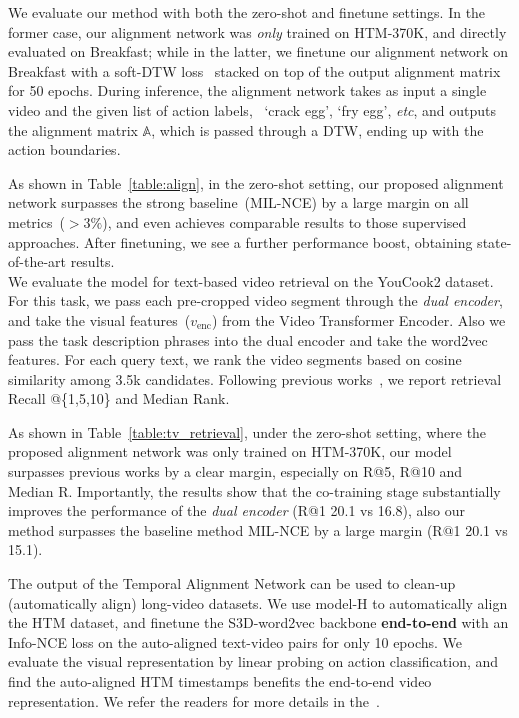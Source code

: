 We evaluate our method with both the zero-shot and finetune settings.
In the former case, 
our alignment network was \emph{only} trained on HTM-370K, 
and directly evaluated on Breakfast;
while in the latter, 
we finetune our alignment network on Breakfast with a soft-DTW loss~\cite{Cuturi17} stacked on top of the output alignment matrix for 50 epochs. 
During inference, the alignment network takes as input a single video and the given list of action labels, ~\ie `crack egg', `fry egg', \emph{etc},
and outputs the alignment matrix $\mathbb{A}$, 
which is passed through a DTW, ending up with the action boundaries.

As shown in Table~\ref{table:align}, 
in the zero-shot setting, 
our proposed alignment network surpasses the strong baseline~(MIL-NCE) by a large margin on all metrics~($>3\%$), and even achieves comparable results to those supervised approaches.
After finetuning, we see a further performance boost, 
obtaining state-of-the-art results.  \\[-9pt]

\vspace{2mm}
We evaluate the model for text-based video retrieval on the YouCook2 dataset.
For this task, 
we pass each pre-cropped video segment through the \emph{dual encoder}, 
and take the visual features~($v_{\text{enc}}$) from the Video Transformer Encoder.
Also we pass the task description phrases into the dual encoder and take the word2vec features.
For each query text,
we rank the video segments based on cosine similarity among 3.5k candidates.
Following previous works~\cite{Miech19,Miech20}, 
we report retrieval Recall @\{1,5,10\} and Median Rank.

As shown in Table~\ref{table:tv_retrieval}, 
under the zero-shot setting, 
where the proposed alignment network was only trained on HTM-370K,
our model surpasses previous works by a clear margin,
especially on R@5, R@10 and Median R.
Importantly, the results show that the co-training stage substantially 
improves the performance of the \emph{dual encoder} (R@1 20.1 vs 16.8),
also our method surpasses the baseline method MIL-NCE 
by a large margin (R@1 20.1 vs 15.1). 

\vspace{2mm}
The output of the Temporal Alignment Network 
can be used to clean-up (automatically align) long-video datasets.
We use model-H to automatically align the HTM dataset,
and finetune the S3D-word2vec backbone \textbf{end-to-end} with an {Info-NCE} loss
on the auto-aligned text-video pairs for only 10 epochs.
We evaluate the visual representation by linear probing on action classification,
and find the auto-aligned HTM timestamps benefits the end-to-end video representation.
We refer the readers for more details in the~\app.

